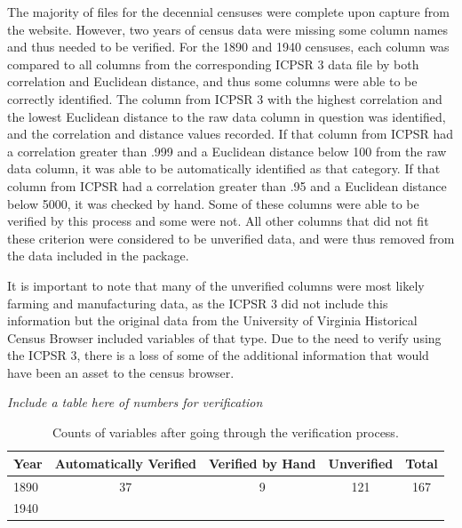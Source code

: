 \documentclass[11pt,]{article}
\begin{document}
The majority of files for the decennial censuses were complete upon
capture from the website. However, two years of census data were missing
some column names and thus needed to be verified. For the 1890 and 1940
censuses, each column was compared to all columns from the corresponding
ICPSR 3 data file by both correlation and Euclidean distance, and thus
some columns were able to be correctly identified. The column from ICPSR
3 with the highest correlation and the lowest Euclidean distance to the
raw data column in question was identified, and the correlation and
distance values recorded. If that column from ICPSR had a correlation
greater than .999 and a Euclidean distance below 100 from the raw data
column, it was able to be automatically identified as that category. If
that column from ICPSR had a correlation greater than .95 and a
Euclidean distance below 5000, it was checked by hand. Some of these
columns were able to be verified by this process and some were not. All
other columns that did not fit these criterion were considered to be
unverified data, and were thus removed from the data included in the
package.

It is important to note that many of the unverified columns were most
likely farming and manufacturing data, as the ICPSR 3 did not include
this information but the original data from the University of Virginia
Historical Census Browser included variables of that type. Due to the
need to verify using the ICPSR 3, there is a loss of some of the
additional information that would have been an asset to the census
browser.

\emph{Include a table here of numbers for verification }

\begin{table}[H]
\centering

  \begin{tabular}{l|c|c|c|c}
  \hline
  Year & Automatically Verified & Verified by Hand & Unverified & Total \\ \hline
  1890 & 37 & 9 & 121 & 167 \\ 
  1940 & & & & \\ 
  \end{tabular}

  \caption{Counts of variables after going through the verification process.}
  \label{verify-table}
\end{table}
\end{document}
